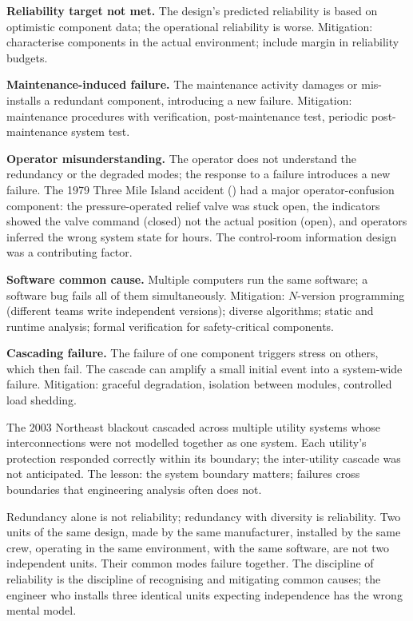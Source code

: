 \textbf{Reliability target not met.} The design's predicted reliability is based on optimistic component data; the operational reliability is worse. Mitigation: characterise components in the actual environment; include margin in reliability budgets.

\textbf{Maintenance-induced failure.} The maintenance activity damages or mis-installs a redundant component, introducing a new failure. Mitigation: maintenance procedures with verification, post-maintenance test, periodic post-maintenance system test.

\textbf{Operator misunderstanding.} The operator does not understand the redundancy or the degraded modes; the response to a failure introduces a new failure. The 1979 Three Mile Island accident (\cite{acc:kemeny-tmi-1979}) had a major operator-confusion component: the pressure-operated relief valve was stuck open, the indicators showed the valve command (closed) not the actual position (open), and operators inferred the wrong system state for hours. The control-room information design was a contributing factor.

\textbf{Software common cause.} Multiple computers run the same software; a software bug fails all of them simultaneously. Mitigation: $N$-version programming (different teams write independent versions); diverse algorithms; static and runtime analysis; formal verification for safety-critical components.

\textbf{Cascading failure.} The failure of one component triggers stress on others, which then fail. The cascade can amplify a small initial event into a system-wide failure. Mitigation: graceful degradation, isolation between modules, controlled load shedding.

The 2003 Northeast blackout cascaded across multiple utility systems whose interconnections were not modelled together as one system. Each utility's protection responded correctly within its boundary; the inter-utility cascade was not anticipated. The lesson: the system boundary matters; failures cross boundaries that engineering analysis often does not.

\begin{principle}
Redundancy alone is not reliability; redundancy with diversity is reliability. Two units of the same design, made by the same manufacturer, installed by the same crew, operating in the same environment, with the same software, are not two independent units. Their common modes failure together. The discipline of reliability is the discipline of recognising and mitigating common causes; the engineer who installs three identical units expecting independence has the wrong mental model.
\end{principle}

